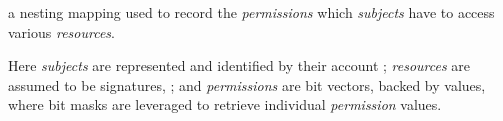 \begin{state}
  \item \attributes

  \begin{public}
    \item {}
      a nesting mapping used to record the \emph{permissions} which
      \emph{subjects} have to access various \emph{resources}.

      \begin{displayquote}
        Here \emph{subjects} are represented and identified by their account
        ; \emph{resources} are assumed to be 
        signatures, ; and \emph{permissions} are bit vectors,
        backed by  values, where bit masks are leveraged to
        retrieve individual \emph{permission} values.
      \end{displayquote}
  \end{public}
\end{state}

